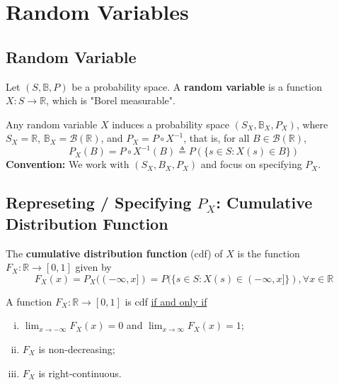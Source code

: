 \documentclass[11pt]{elegantbook}
\begin{document}
\section{Random Variables}

\subsection{Random Variable}
\begin{definition}
    \normalfont
    Let $(S,\mathbb{B},P)$ be a probability space. A \textbf{random variable} is a function $X: S \rightarrow \mathbb{R}$, which is "Borel measurable".
\end{definition}

\begin{definition}
    \normalfont
    Any random variable $X$ induces a probability space $(S_X,\mathbb{B}_X,P_X)$, where $S_X=\mathbb{R}$, $\mathbb{B}_X=\mathcal{B}(\mathbb{R})$, and $P_X=P\circ X^{-1}$, that is, for all $B\in \mathcal{B}(\mathbb{R})$, $$P_X(B)=P\circ X^{-1}(B)\triangleq P(\{s\in S: X(s)\in B\})$$
    \textbf{Convention:} We work with $(S_X,B_X,P_X)$ and focus on specifying $P_X$.
\end{definition}

\subsection{Represeting / Specifying $P_X$: Cumulative Distribution Function}
\begin{definition}
    \normalfont
    The \textbf{cumulative distribution function} (cdf) of $X$ is the function $F_X: \mathbb{R} \rightarrow [0,1]$ given by $$F_X(x)=P_X((-\infty,x])=P(\{s\in S: X(s)\in (-\infty,x]\}), \forall x\in \mathbb{R}$$
\end{definition}

\begin{theorem}
    A function $F_X: \mathbb{R} \rightarrow [0,1]$ is cdf \underline{if and only if}
    \begin{enumerate}[(i).]
        \item $\lim_{x \rightarrow -\infty} F_X(x)=0$ and $\lim_{x \rightarrow \infty} F_X(x)=1$;
        \item $F_X$ is non-decreasing;
        \item $F_X$ is right-continuous.
    \end{enumerate}
\end{theorem}
\end{document}
